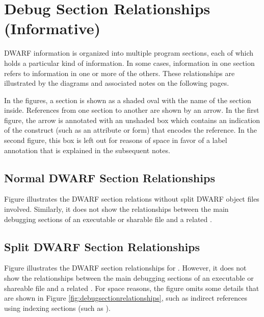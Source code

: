 \chapter{Debug Section Relationships (Informative)}
\label{app:debugsectionrelationshipsinformative}
DWARF information is organized into multiple program sections,
each of which holds a particular kind of information. In some
cases, information in one section refers to information in one
or more of the others. These relationships are illustrated by
the diagrams and associated notes on the following pages.

In the figures, a section is shown as a shaded oval with the
name of the section inside. References from one section to
another are shown by an arrow. In the first figure, the arrow
is annotated with an unshaded box which contains an indication
of the construct (such as an attribute or form) that encodes
the reference. In the second figure, this box is left out
for reasons of space in favor of a label annotation that is
explained in the subsequent notes.

\section{Normal DWARF Section Relationships}
Figure  illustrates
the DWARF section relations without split DWARF object files
involved. Similarly, it does not show the
relationships between the main debugging sections of an executable
or sharable file and a related .

\section{Split DWARF Section Relationships}
Figure  illustrates
the DWARF section relationships for .
However, it does not show the
relationships between the main debugging sections of an executable
or shareable file and a related .
\bb
For space reasons, the figure omits some details that are shown in
Figure \ref{fig:debugsectionrelationships}, such as indirect references
using indexing sections (such as \dotdebugstroffsets).
\eb

